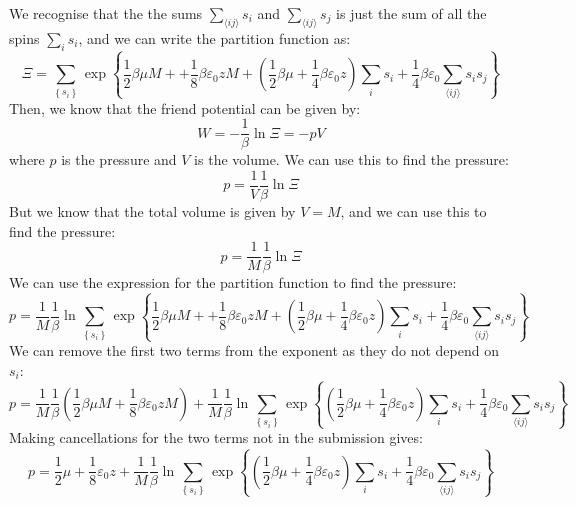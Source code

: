 \documentclass[12pt]{article}
\begin{document}
We recognise that the the sums $\sum _{\langle i j \rangle} s _{i}$ and $\sum _{\langle i j \rangle} s _{j}$ is just the sum of all the spins $\sum _{i} s _{i}$, and we can write the partition function as:
\begin{equation}
\Xi=\sum_{\left\{s_{i}\right\}} \exp \left\{\frac{1}{2} \beta \mu M +  + \frac{1}{8} \beta \varepsilon_{0} z M + \left( \frac{1}{2} \beta \mu + \frac{1}{4} \beta \varepsilon_{0} z \right) \sum_{i} s_{i} + \frac{1}{4} \beta \varepsilon_{0} \sum_{\langle i j\rangle} s_{i} s_{j}\right\}
\end{equation}
Then, we know that the friend potential can be given by:
\begin{equation}
W = -\frac{1}{\beta} \ln \Xi = -pV
\end{equation}
where $p$ is the pressure and $V$ is the volume. We can use this to find the pressure:
\begin{equation}
p = \frac{1}{V} \frac{1}{\beta} \ln \Xi
\end{equation}
But we know that the total volume is given by $V = M$, and we can use this to find the pressure:
\begin{equation}
p = \frac{1}{M} \frac{1}{\beta} \ln \Xi
\end{equation}
We can use the expression for the partition function to find the pressure:
\begin{equation}
p = \frac{1}{M} \frac{1}{\beta} \ln \sum_{\left\{s_{i}\right\}} \exp \left\{\frac{1}{2} \beta \mu M +  + \frac{1}{8} \beta \varepsilon_{0} z M + \left( \frac{1}{2} \beta \mu + \frac{1}{4} \beta \varepsilon_{0} z \right) \sum_{i} s_{i} + \frac{1}{4} \beta \varepsilon_{0} \sum_{\langle i j\rangle} s_{i} s_{j}\right\}
\end{equation}
We can remove the first two terms from the exponent as they do not depend on $s _{i}$:
\begin{equation}
p = \frac{1}{M} \frac{1}{\beta} \left( \frac{1}{2}\beta \mu M + \frac{1}{8} \beta \varepsilon_{0} z M \right) + \frac{1}{M} \frac{1}{\beta} \ln \sum_{\left\{s_{i}\right\}} \exp \left\{ \left( \frac{1}{2} \beta \mu + \frac{1}{4} \beta \varepsilon_{0} z \right) \sum_{i} s_{i} + \frac{1}{4} \beta \varepsilon_{0} \sum_{\langle i j\rangle} s_{i} s_{j}\right\}
\end{equation}
Making cancellations for the two terms not in the submission gives:
\begin{equation}
p = \frac{1}{2} \mu + \frac{1}{8} \varepsilon_{0} z + \frac{1}{M} \frac{1}{\beta} \ln \sum_{\left\{s_{i}\right\}} \exp \left\{ \left( \frac{1}{2} \beta \mu + \frac{1}{4} \beta \varepsilon_{0} z \right) \sum_{i} s_{i} + \frac{1}{4} \beta \varepsilon_{0} \sum_{\langle i j\rangle} s_{i} s_{j}\right\}
\end{equation}
\end{document}
